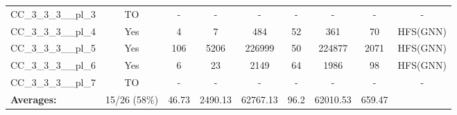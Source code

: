 \documentclass{article}
\begin{document}
\begin{tabular}{lcccccccc}
CC\_3\_3\_3\_\_pl\_3 & TO & - & - & - & - & - & - & - \\
CC\_3\_3\_3\_\_pl\_4 & Yes & 4 & 7 & 484 & 52 & 361 & 70 & HFS(GNN) \\
CC\_3\_3\_3\_\_pl\_5 & Yes & 106 & 5206 & 226999 & 50 & 224877 & 2071 & HFS(GNN) \\
CC\_3\_3\_3\_\_pl\_6 & Yes & 6 & 23 & 2149 & 64 & 1986 & 98 & HFS(GNN) \\
CC\_3\_3\_3\_\_pl\_7 & TO & - & - & - & - & - & - & - \\
\textbf{Averages:} & 15/26 (58\%) & 46.73 & 2490.13 & 62767.13 & 96.2 & 62010.53 & 659.47 & \\
\bottomrule
\end{tabular}
\\[0.7cm]
\end{document}
